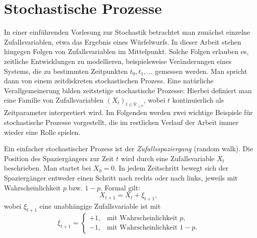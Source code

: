 \section{Stochastische Prozesse}

In einer einführenden Vorlesung zur Stochastik betrachtet man zunächst einzelne Zufallsvariablen, 
etwa das Ergebnis eines Würfelwurfs. In dieser Arbeit stehen hingegen Folgen von 
Zufallsvariablen im Mittelpunkt. Solche Folgen erlauben es, zeitliche Entwicklungen zu modellieren,
beispielsweise Veränderungen eines Systems, die zu bestimmten Zeitpunkten $t_0, t_1, \dots$ gemessen werden.
Man spricht dann von einem zeitdiskreten stochastischen Prozess. Eine natürliche 
Verallgemeinerung bilden zeitstetige stochastische Prozesse: Hierbei definiert man eine 
Familie von Zufallsvariablen $(X_t)_{t \in \mathbb{R}_{\ge 0}}$, wobei $t$ kontinuierlich als 
Zeitparameter interpretiert wird. Im Folgenden werden zwei wichtige Beispiele für stochastische Prozesse 
vorgestellt, die im restlichen Verlauf der Arbeit immer wieder eine Rolle spielen.

\begin{bsp}[Zufallsspaziergang]
Ein einfacher stochastischer Prozess ist der \textit{Zufallsspaziergang} (random walk).
Die Position des Spaziergängers zur Zeit $t$ wird durch eine Zufallsvariable $X_t$ beschrieben. 
Man startet bei $X_0 = 0$. In jedem Zeitschritt bewegt sich der Spaziergänger entweder 
einen Schritt nach rechts oder nach links, jeweils mit Wahrscheinlichkeit $p$ bzw. $1-p$. 
Formal gilt:
$$
X_{t+1} = X_t + \xi_{t+1},
$$
wobei $\xi_{t+1}$ eine unabhängige Zufallsvariable ist mit
$$
\xi_{t+1} = 
\begin{cases} 
+1, & \text{mit Wahrscheinlichkeit } p, \\
-1, & \text{mit Wahrscheinlichkeit } 1-p.
\end{cases}
$$

\end{bsp}

